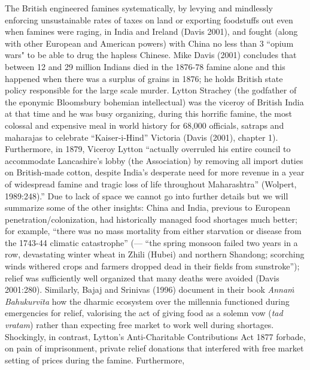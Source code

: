 The British engineered famines systematically, by levying and mindlessly enforcing unsustainable rates of taxes on land or exporting foodstuffs out even when famines were raging, in India and Ireland (Davis 2001), and fought (along with other European and American powers) with China no less than 3 ``opium wars" to be able to drug the hapless Chinese. Mike Davis (2001) concludes that between 12 and 29 million Indians died in the 1876-78 famine alone and this happened when there was a surplus of grains in 1876; he holds British state policy responsible for the large scale murder. Lytton Strachey (the godfather of the eponymic Bloomsbury bohemian intellectual) was the viceroy of British India at that time and he was busy organizing, during this horrific famine, the most colossal and expensive meal in world history for 68,000 officials, satraps and maharajas to celebrate “Kaiser-i-Hind” Victoria (Davis (2001), chapter 1). Furthermore, in 1879, Viceroy Lytton “actually overruled his entire council to accommodate Lancashire’s lobby (the Association) by removing all import duties on British-made cotton, despite India’s desperate need for more revenue in a year of widespread famine and tragic loss of life throughout Maharashtra” (Wolpert, 1989:248).” Due to lack of space we cannot go into further details but we will summarize some of the other insights: China and India, previous to European penetration/colonization, had historically managed food shortages much better; for example, “there was no mass mortality from either starvation or disease from the 1743-44 climatic catastrophe” (--- “the spring monsoon failed two years in a row, devastating winter wheat in Zhili (Hubei) and northern Shandong; scorching winds withered crops and farmers dropped dead in their fields from sunstroke”); relief was sufficiently well organized that many deaths were avoided (Davis 2001:280). Similarly, Bajaj and Srinivas (1996) document in their book {\sl Annaṁ Bahukurvīta} how the dharmic ecosystem over the millennia  functioned during emergencies for relief, valorising the act of giving food as a solemn vow ({\sl tad vratam}) rather than expecting free market to work well during shortages. Shockingly, in contrast, Lytton's Anti-Charitable Contributions Act 1877 forbade, on pain of imprisonment, private relief donations that interfered with free market setting of prices during the famine.  Furthermore, 
\eject

